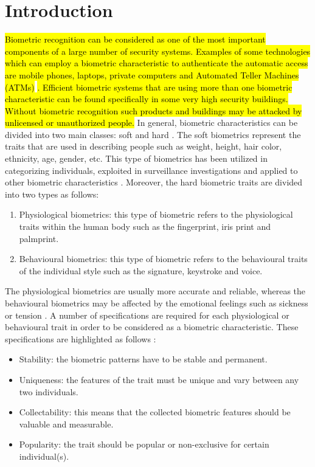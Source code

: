 \documentclass[review]{elsarticle}
\begin{document}
\linenumbers

\section{Introduction}
	\hl{Biometric recognition can be considered as one of the most important components of a large number of security systems. Examples of some technologies which can employ a biometric characteristic to authenticate the automatic access are mobile phones, laptops, private computers and Automated Teller Machines (ATMs)} \cite{Jain2004AnIntroduction}\hl{. Efficient biometric systems that are using more than one biometric characteristic can be found specifically in some very high security buildings. Without biometric recognition such products and buildings may be attacked by unlicensed or unauthorized people.}	In general, biometric characteristics can be divided into two main classes: soft and hard \cite{jaswal2016knuckle}. The soft biometrics represent the traits that are used in describing people such as weight, height, hair color, ethnicity, age, gender, etc. This type of biometrics has been utilized in categorizing individuals, exploited in surveillance investigations and applied to other biometric characteristics \cite{dantcheva2016else}. Moreover, the hard biometric traits are divided into two types as follows:
	\begin{enumerate}
		\item Physiological biometrics: this type of biometric refers to the physiological traits within the human body such as the fingerprint, iris print and palmprint. 
		\item Behavioural biometrics: this type of biometric refers to the behavioural traits of the individual style such as the signature, keystroke and voice. 
	\end{enumerate}

	The physiological biometrics are usually more accurate and reliable, whereas the behavioural biometrics may be affected by the emotional feelings such as sickness or tension \cite{matyavs2000biometric}. A number of specifications are required for each physiological or behavioural trait in order to be considered as a biometric characteristic. These specifications are highlighted as follows \cite{Jain2004AnIntroduction}:
	\begin{itemize}
		\item Stability: the biometric patterns have to be stable and permanent.
		\item Uniqueness: the features of the trait must be unique and vary between any two individuals.
		\item Collectability: this means that the collected biometric features should be valuable and measurable.
		\item Popularity: the trait should be popular or non-exclusive for certain individual(s). 
	\end{itemize}
\end{document}

